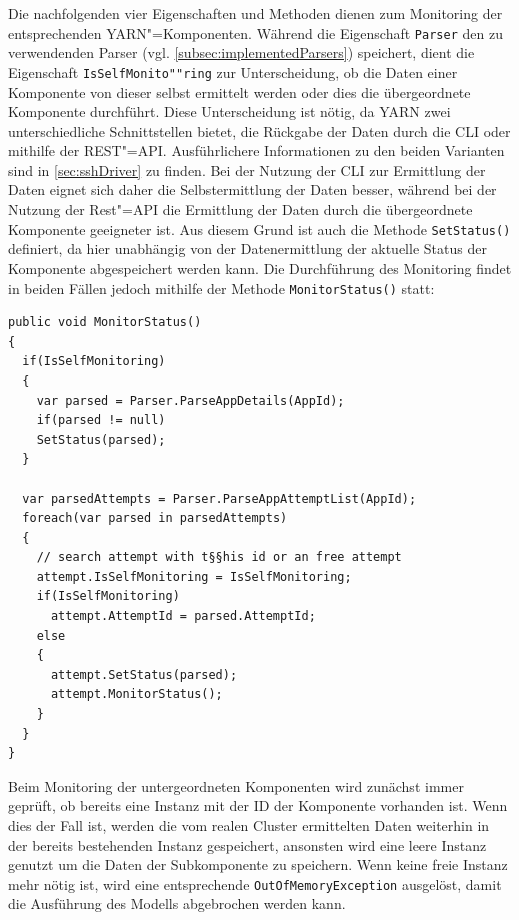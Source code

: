 Die nachfolgenden vier Eigenschaften und Methoden dienen zum Monitoring der entsprechenden \gls{YARN}"=Komponenten.
Während die Eigenschaft \texttt{Parser} den zu verwendenden Parser (vgl. \cref{subsec:implementedParsers}) speichert, dient die Eigenschaft \texttt{IsSelfMonito""ring} zur Unterscheidung, ob die Daten einer Komponente von dieser selbst ermittelt werden oder dies die übergeordnete Komponente durchführt.
Diese Unterscheidung ist nötig, da \gls{YARN} zwei unterschiedliche Schnittstellen bietet, die Rückgabe der Daten durch die \gls{CLI} oder mithilfe der \gls{REST}"=API.
Ausführlichere Informationen zu den beiden Varianten sind in \cref{sec:sshDriver} zu finden.
Bei der Nutzung der \gls{CLI} zur Ermittlung der Daten eignet sich daher die Selbstermittlung der Daten besser, während bei der Nutzung der Rest"=API die Ermittlung der Daten durch die übergeordnete Komponente geeigneter ist.
Aus diesem Grund ist auch die Methode \texttt{SetStatus()} definiert, da hier unabhängig von der Datenermittlung der aktuelle Status der Komponente abgespeichert werden kann.
Die Durchführung des Monitoring findet in beiden Fällen jedoch mithilfe der Methode \texttt{MonitorStatus()} statt:

\begin{lstlisting}[label=lst:monitorAppStatus,style=cs,
caption={[Implementierung der Methode MonitorStatus() in der Klasse YarnApp]
    Implementierung der Methode \texttt{MonitorStatus()} in der Klasse \texttt{YarnApp} (gekürzt).
    Das Monitoring der anderen Komponenten erfolgt analog hierzu.}]
public void MonitorStatus()
{
  if(IsSelfMonitoring)
  {
    var parsed = Parser.ParseAppDetails(AppId);
    if(parsed != null)
    SetStatus(parsed);
  }
  
  var parsedAttempts = Parser.ParseAppAttemptList(AppId);
  foreach(var parsed in parsedAttempts)
  {
    // search attempt with t§§his id or an free attempt
    attempt.IsSelfMonitoring = IsSelfMonitoring;
    if(IsSelfMonitoring)
      attempt.AttemptId = parsed.AttemptId;
    else
    {
      attempt.SetStatus(parsed);
      attempt.MonitorStatus();
    }
  }
}
\end{lstlisting}

Beim Monitoring der untergeordneten Komponenten wird zunächst immer geprüft, ob bereits eine Instanz mit der ID der Komponente vorhanden ist.
Wenn dies der Fall ist, werden die vom realen Cluster ermittelten Daten weiterhin in der bereits bestehenden Instanz gespeichert, ansonsten wird eine leere Instanz genutzt um die Daten der Subkomponente zu speichern.
Wenn keine freie Instanz mehr nötig ist, wird eine entsprechende \texttt{OutOfMemoryException} ausgelöst, damit die Ausführung des Modells abgebrochen werden kann.

